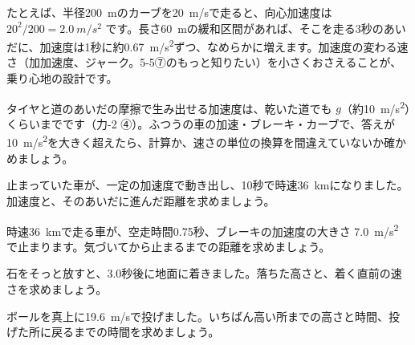 \begin{phkougaku}
たとえば、半径\qty{200}{m}のカーブを\qty{20}{m/s}で走ると、向心加速度は $20^2/200=\qty{2.0}{m/s^2}$ です。長さ\qty{60}{m}の緩和区間があれば、そこを走る3秒のあいだに、加速度は1秒に約\qty{0.67}{m/s^2}ずつ、なめらかに増えます。加速度の変わる速さ（加加速度、ジャーク。\mbox{5-5⑦}のもっと知りたい）を小さくおさえることが、乗り心地の設計です。

\begin{phketa}[動きの速さと加速度]
タイヤと道のあいだの摩擦で生み出せる加速度は、乾いた道でも $g$（約\qty{10}{m/s^2}）くらいまでです（力-2 ④）。ふつうの車の加速・ブレーキ・カーブで、答えが\qty{10}{m/s^2}を大きく超えたら、計算か、速さの単位の換算を間違えていないか確かめましょう。
\end{phketa}
\end{phkougaku}



\bkendproblems
{}
\bkproblem 止まっていた車が、一定の加速度で動き出し、10秒で時速\qty{36}{km}になりました。加速度と、そのあいだに進んだ距離を求めましょう。

\bkproblem 時速\qty{36}{km}で走る車が、空走時間0.75秒、ブレーキの加速度の大きさ \qty{7.0}{m/s^2} で止まります。気づいてから止まるまでの距離を求めましょう。

\bkproblem 石をそっと放すと、3.0秒後に地面に着きました。落ちた高さと、着く直前の速さを求めましょう。

\bkproblem ボールを真上に\qty{19.6}{m/s}で投げました。いちばん高い所までの高さと時間、投げた所に戻るまでの時間を求めましょう。

